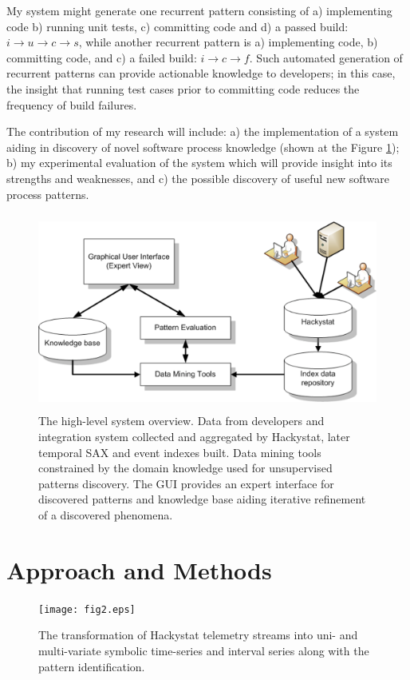 \documentclass[11pt,oneside]{article}
\begin{document}
My system might generate one recurrent pattern consisting of a) implementing code b) running unit tests, c) committing code and d) a passed build: $i \rightarrow u \rightarrow c \rightarrow s $, while another recurrent pattern is a) implementing code, b) committing code, and c) a failed build: $i \rightarrow c \rightarrow f $. Such automated generation of recurrent patterns can provide actionable knowledge to developers; in this case, the insight that running test cases prior to committing code reduces the frequency of build failures.

The contribution of my research will include: a) the implementation of a system aiding in discovery of novel software process knowledge (shown at the Figure \ref{fig:system_overview}); b) my experimental evaluation of the system which will provide insight into its strengths and weaknesses, and c) the possible discovery of useful new software process patterns.
\begin{figure}[tbp]
   \centering
   \includegraphics[height=65mm]{system_overview.eps}
   \caption{The high-level system overview. Data from developers and integration system collected and aggregated by Hackystat, later temporal SAX and event indexes built. Data mining tools constrained by the domain knowledge used for unsupervised patterns discovery. The GUI provides an expert interface for discovered patterns and knowledge base aiding iterative refinement of a discovered phenomena.}
   \label{fig:system_overview}
\end{figure}

\section{Approach and Methods}
\begin{figure}[tbp]
   \centering
   \texttt{[image: fig2.eps]}
   \caption{The transformation of Hackystat telemetry streams into uni- and multi-variate symbolic time-series and interval series along with the pattern identification.}
   \label{fig:fig2}
\end{figure}
\end{document}
